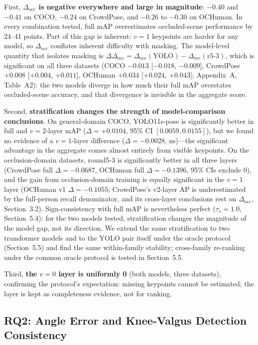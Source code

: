\documentclass[10pt,conference]{IEEEtran}
\begin{document}
First, \textbf{$\Delta_{\mathrm{occ}}$ is negative everywhere and large in magnitude}: $-0.40$ and $-0.41$ on COCO, $-0.24$ on CrowdPose, and $-0.26$ to $-0.30$ on OCHuman. In every combination tested, full mAP overestimates occluded-scene performance by 24--41 points. Part of this gap is inherent: $v{=}1$ keypoints are harder for any model, so $\Delta_{\mathrm{occ}}$ conflates inherent difficulty with masking. The model-level quantity that isolates masking is $\Delta\Delta_{\mathrm{occ}}=\Delta_{\mathrm{occ}}(\mathrm{YOLO})-\Delta_{\mathrm{occ}}(\mathrm{r5\text{-}3})$, which is significant on all three datasets (COCO $-0.013$ [$-0.018$, $-0.009$], CrowdPose $+0.008$ [$+0.004$, $+0.011$], OCHuman $+0.034$ [$+0.024$, $+0.043$]; Appendix~A, Table~A2): the two models diverge in how much their full mAP overstates occluded-scene accuracy, and that divergence is invisible in the aggregate score.

Second, \textbf{stratification changes the strength of model-comparison conclusions}. On general-domain COCO, YOLO11s-pose is significantly better in full and $v{=}2$-layer mAP ($\Delta=+0.0104$, 95\% CI $[0.0059,0.0155]$), but we found no evidence of a $v{=}1$-layer difference ($\Delta=-0.0028$, ns)---the significant advantage in the aggregate comes almost entirely from visible keypoints. On the occlusion-domain datasets, round5-3 is significantly better in all three layers (CrowdPose full $\Delta=-0.0687$, OCHuman full $\Delta=-0.1396$, 95\% CIs exclude 0), and the gain from occlusion-domain training is equally significant in the $v{=}1$ layer (OCHuman v1 $\Delta=-0.1055$; CrowdPose's v2-layer AP is underestimated by the full-person recall denominator, and its cross-layer conclusions rest on $\Delta_{\mathrm{occ}}$, Section~3.2). Sign-consistency with full mAP is nevertheless perfect ($\tau_s=1.0$, Section~5.4): for the two models tested, stratification changes the magnitude of the model gap, not its direction. We extend the same stratification to two transformer models and to the YOLO pair itself under the oracle protocol (Section~5.5) and find the same within-family stability; cross-family re-ranking under the common oracle protocol is tested in Section~5.5.

Third, \textbf{the $v{=}0$ layer is uniformly 0} (both models, three datasets), confirming the protocol's expectation: missing keypoints cannot be estimated; the layer is kept as completeness evidence, not for ranking.

\subsection{RQ2: Angle Error and Knee-Valgus Detection Consistency}
\end{document}
